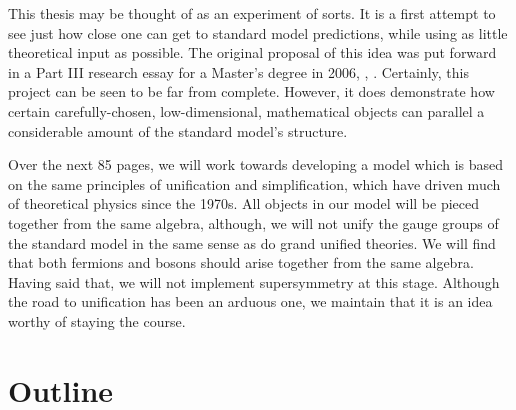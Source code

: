 \documentclass[letterpaper,12pt,titlepage,oneside,final]{book}
\begin{document}
This thesis may be thought of as an experiment of sorts.  It is a first attempt to see just how close one can get to standard model predictions, while using as little theoretical input as possible.  The original proposal of this idea was put forward in a Part III research essay for a Master's degree in 2006, \cite{cm}, \cite{cmnotes}.  Certainly, this project can be seen to be far from complete.  However, it does demonstrate how certain carefully-chosen, low-dimensional, mathematical objects can parallel a considerable amount of the standard model's structure.  





Over the next 85 pages, we will work towards developing a model which is based on the same principles of unification and simplification, which have driven much of theoretical physics since the 1970s.  All objects in our model will be pieced together from the same algebra, although, we will not unify the gauge groups of the standard model in the same sense as do grand unified theories.  We will find that both fermions and bosons should arise together from the same algebra.  Having said that, we will not implement supersymmetry at this stage.  Although the road to unification has been an arduous one, we maintain that it is an idea worthy of staying the course.



\section{Outline}
\end{document}
